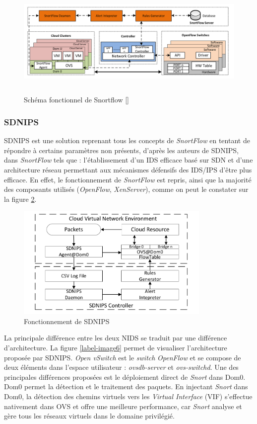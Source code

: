\begin{figure}[h]
	\center
	\includegraphics[height=5.5cm]{./pics/snortflow.png}
	\caption{Schéma fonctionnel de Snortflow [\cite{snortflow}]}
	\label{label-image5}
\end{figure}


\subsubsection{SDNIPS}

SDNIPS \cite{sdnips} est une solution reprenant tous les concepts de \textit{SnortFlow} en tentant de répondre à certains paramètres non présents, d'après les auteurs de SDNIPS, dans \textit{SnortFlow}  tels que : l'établissement d'un IDS efficace basé sur SDN et d'une architecture réseau permettant aux mécanismes défensifs des IDS/IPS d'être plus efficace. En effet, le fonctionnement de \textit{SnortFlow} est repris, ainsi que la majorité des composants utilisés (\textit{OpenFlow}, \textit{XenServer}), comme on peut le constater sur la figure \ref{label-image9}.

\begin{figure}[h]
	\center
	\includegraphics[height=5.5cm]{./pics/SDNIPS_fonctionnement.png}
	\caption{Fonctionnement de SDNIPS \cite{sdnips}}
	\label{label-image9}
\end{figure}

La principale différence entre les deux NIDS se traduit par une différence d'architecture. La figure \ref{label-image6} permet de visualiser l'architecture proposée par SDNIPS. \textit{Open vSwitch} est le \textit{switch} \textit{OpenFlow} et se compose de deux éléments dans l'espace utilisateur : \textit{ovsdb-server} et \textit{ovs-switchd}. Une des principales différences proposées est le déploiement direct de \textit{Snort} dans Dom0. Dom0 permet la détection et le traitement des paquets. En injectant \textit{Snort} dans Dom0, la détection des chemins virtuels vers les \textit{Virtual Interface} (VIF) s'effectue nativement dans OVS et offre une meilleure performance, car \textit{Snort} analyse et gère tous les réseaux virtuels dans le domaine privilégié.

